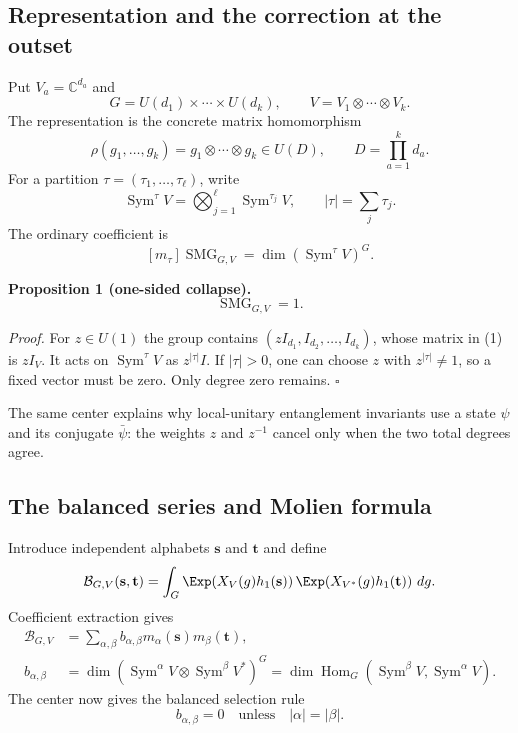 \documentclass[10pt]{article}
\newcommand{\Sym}{\operatorname{Sym}}
\newcommand{\SMG}{\operatorname{SMG}}
\newcommand{\Hom}{\operatorname{Hom}}
\begin{document}
\subsection{Representation and the correction at the outset}

Put $V_a=\mathbb C^{d_a}$ and
\[
 G=U(d_1)\times\cdots\times U(d_k),\qquad
 V=V_1\otimes\cdots\otimes V_k.
\]
The representation is the concrete matrix homomorphism
\begin{equation}
 \rho(g_1,\ldots,g_k)=g_1\otimes\cdots\otimes g_k
 \in U(D),\qquad D=\prod_{a=1}^kd_a.
\end{equation}
For a partition $\tau=(\tau_1,\ldots,\tau_\ell)$, write
\[
 \Sym^\tau V=\bigotimes_{j=1}^{\ell}\Sym^{\tau_j}V,
 \qquad |\tau|=\sum_j\tau_j.
\]
The ordinary coefficient is
\[
 [m_\tau]\SMG_{G,V}=\dim(\Sym^\tau V)^G.
\]

\textbf{Proposition 1 (one-sided collapse).}
\begin{equation}
 \boxed{\SMG_{G,V}=1.}
\end{equation}

\textit{Proof.}
For $z\in U(1)$ the group contains
$(zI_{d_1},I_{d_2},\ldots,I_{d_k})$, whose matrix in (1) is $zI_V$.
It acts on $\Sym^\tau V$ as $z^{|\tau|}I$. If $|\tau|>0$, one can choose
$z$ with $z^{|\tau|}\ne1$, so a fixed vector must be zero. Only degree zero
remains. \hfill$\square$

The same center explains why local-unitary entanglement invariants use a state
$\psi$ and its conjugate $\bar\psi$: the weights $z$ and $z^{-1}$ cancel only
when the two total degrees agree.

\subsection{The balanced series and Molien formula}

Introduce independent alphabets $\mathbf s$ and $\mathbf t$ and define
\begin{equation}
 \mathcal B_{G,V}(\mathbf s,\mathbf t)
 =\int_G \Exp\!\left(X_V(g)h_1(\mathbf s)\right)
          \Exp\!\left(X_{V^*}(g)h_1(\mathbf t)\right)\,dg.
\end{equation}
Coefficient extraction gives
\begin{align}
 \mathcal B_{G,V}
 &=\sum_{\alpha,\beta}b_{\alpha,\beta}
          m_\alpha(\mathbf s)m_\beta(\mathbf t),\\
 b_{\alpha,\beta}
 &=\dim\left(\Sym^\alpha V\otimes\Sym^\beta V^*\right)^G
  =\dim\Hom_G(\Sym^\beta V,\Sym^\alpha V).
\end{align}
The center now gives the balanced selection rule
\begin{equation}
 \boxed{b_{\alpha,\beta}=0\quad\text{unless}\quad
 |\alpha|=|\beta|.}
\end{equation}
\end{document}
